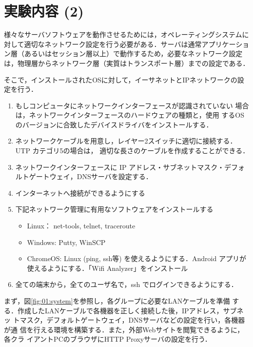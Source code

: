 \clearpage
\section{実験内容 (2)}

様々なサーバソフトウェアを動作させるためには，オペレーティングシステムに対して適切なネットワーク設定を行う必要がある．サーバは通常アプリケーション層（あるいはセッション層以上）で動作するため，必要なネットワーク設定は，物理層からネットワーク層（実質はトランスポート層）までの設定である．

そこで，インストールされたOSに対して，イーサネットとIPネットワークの設定を行う．
\begin{enumerate}
 \item もしコンピュータにネットワークインターフェースが認識されていない
       場合は，ネットワークインターフェースのハードウェアの種類と，使用
       するOSのバージョンに合致したデバイスドライバをインストールする．
 \item ネットワークケーブルを用意し，レイヤー2スイッチに適切に接続する．UTP カテゴリ5の場合は，
       適切な長さのケーブルを作成することができる．
 \item ネットワークインターフェースに IP アドレス・サブネットマスク・デフォ
       ルトゲートウェイ，DNSサーバを設定する．
 \item インターネットへ接続ができるようにする
 \item 下記ネットワーク管理に有用なソフトウェアをインストールする
 \begin{itemize}
     \item Linux： net-tools, telnet, traceroute
     \item Windows: Putty, WinSCP
     \item ChromeOS: Linux (ping, ssh等) を使えるようにする．Android アプリが使えるようにする．「Wifi Analyzer」をインストール
 \end{itemize}
 \item 全ての端末から，全てのユーザ名で，ssh でログインできるようにする．
\end{enumerate}

まず，図\ref{fig:01:system}を参照し，各グループに必要なLANケーブルを準備
する．作成したLANケーブルで各機器を正しく接続した後，IPアドレス，サブネッ
トマスク，デフォルトゲートウェイ，DNSサーバなどの設定を行い，各機器が通
信を行える環境を構築する．また，外部Webサイトを閲覧できるように，各クラ
イアントPCのブラウザにHTTP Proxyサーバの設定を行う．

